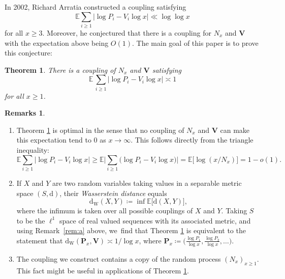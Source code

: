 \documentclass[JEP,XML,SOM,Unicode,published]{cedram}
\newenvironment{enumeratea}
{\bgroup\def\theenumi{\alph{enumi}}\begin{enumerate}}
{\end{enumerate}\egroup}
\newcommand{\bP}{{\boldsymbol P}}
\newcommand{\bV}{{\boldsymbol V}}
\newcommand{\EE}{\mathbb{E}}
\newcommand{\dw}{\mathrm{d}_{\mathrm W}}
\newcommand{\bg}{\big}
\newcommand{\bgg}{\Big}
\theoremstyle{plain}
\newtheorem{theo}{Theorem}
\theoremstyle{definition}
\newtheorem*{remss}{Remarks}
\begin{document}
In 2002, Richard Arratia \cite{Arratia02} constructed a coupling satisfying
\begin{equation}
\label{eq:arratia02-result}
\EE\sum_{i \ge 1} \bg|{\log P_i - V_i\log x}\bg| \ll \log\!\log x
\end{equation}
for all $x \ge 3$. Moreover, he conjectured that there is a coupling for $N_x$ and $\bV$ with the expectation above being $O(1)$. The main goal of this paper is to prove this conjecture:

\begin{theo}
\label{thm:coupling-ub}
There is a coupling of $N_x$ and $\bV$ satisfying
\[
\EE\, \sum_{i \ge 1} \bg|{\log P_i - V_i\log x}\bg| \asymp 1
\]
for all $x \ge 1$.
\end{theo}

\skpt
\begin{remss}
\begin{enumeratea}
\item\label{rem:a}
Theorem \ref{thm:coupling-ub} is optimal in the sense that no coupling of $N_x$ and $\bV$ can make this expectation tend to $0$ as $x \to \infty$. This follows directly from the triangle inequality:
\[
\EE \sum_{i \ge 1} \bg|{\log P_i - V_i\log x}\bg| \ge \EE \bgg|\sum_{i \ge 1} \bg(\log P_i - V_i\log x\bg)\bgg| = \EE \bg[\log(x/N_x)\bg] = 1-o(1).
\]

\item\label{rem:b}
If $X$ and $Y$ are two random variables taking values in a separable metric space $(S,\mathrm{d})$, their {\it Wasserstein distance} equals
\begin{equation}
\label{eq:def wasserstein}
\dw(X,Y) \coloneqq \inf \EE\bg[\mathrm{d}(X,Y)\bg],
\end{equation}
where the infimum is taken over all possible couplings of $X$ and $Y$. Taking $S$ to be the $\ell^1$ space of real valued sequences with its associated metric, and using Remark~\eqref{rem:a} above, we~find that Theorem \ref{thm:coupling-ub} is equivalent to the statement that $\dw(\bP_x, \bV) \asymp1/\log x$, where $\bP_x \coloneqq \bg(\frac{\log P_1}{\log x}, \frac{\log P_2}{\log x}, \ldots\bg)$.

\item\label{rem:c}
The coupling we construct contains a copy of the random process $(N_x)_{x \ge 1}$. This fact might be useful in applications of Theorem \ref{thm:coupling-ub}.


\end{enumeratea}
\end{remss}
\end{document}
